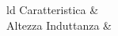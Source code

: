 \begin{table}
    \begin{ruledtabular}
        \begin{tabular}{ld}
            Caratteristica & \\
            Altezza Induttanza & 
            
        \end{tabular}
    \end{ruledtabular}
\end{table}